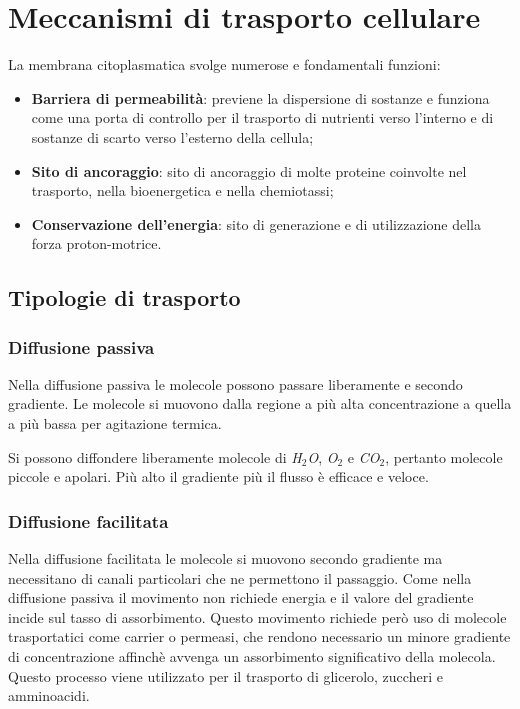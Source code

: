 \chapter{Meccanismi di trasporto cellulare}
La membrana citoplasmatica svolge numerose e fondamentali funzioni: 
\begin{itemize}
    \item \textbf{Barriera di permeabilit\`a}: previene la dispersione di sostanze e funziona come una porta di controllo per il trasporto di nutrienti verso l'interno e di sostanze di scarto verso l'esterno della cellula; 
    \item \textbf{Sito di ancoraggio}: sito di ancoraggio di molte proteine coinvolte nel trasporto, nella bioenergetica e nella chemiotassi; 
    \item \textbf{Conservazione dell'energia}: sito di generazione e di utilizzazione della forza proton-motrice.
\end{itemize}

\section{Tipologie di trasporto}
	
	\subsection{Diffusione passiva}
	Nella diffusione passiva le molecole possono passare liberamente e secondo gradiente.
	Le molecole si muovono dalla regione a pi\`u alta concentrazione a quella a pi\`u bassa per agitazione termica. 

	Si possono diffondere liberamente molecole di \emph{H$_2$O}, \emph{O$_2$} e \emph{CO$_2$}, pertanto molecole piccole e apolari.
	Pi\`u alto il gradiente pi\`u il flusso \`e efficace e veloce.	


	\subsection{Diffusione facilitata}
	Nella diffusione facilitata le molecole si muovono secondo gradiente ma necessitano di canali particolari che ne permettono il passaggio.
	Come nella diffusione passiva il movimento non richiede energia e il valore del gradiente incide sul tasso di assorbimento.
	Questo movimento richiede per\`o uso di molecole trasportatici come carrier o permeasi, che rendono necessario un minore gradiente di concentrazione affinch\`e avvenga un assorbimento significativo della molecola.
	Questo processo viene utilizzato per il trasporto di glicerolo, zuccheri e amminoacidi.

